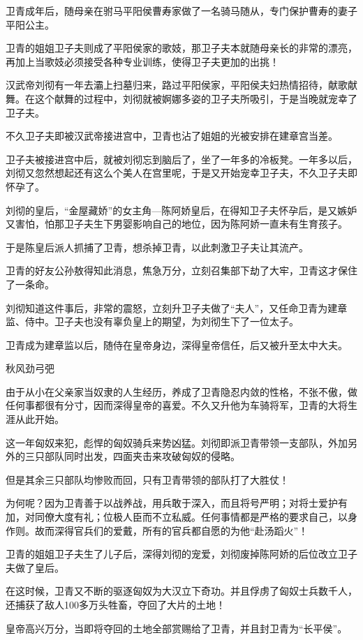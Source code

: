 \documentclass[UTF8,cap,nofonts,openany,twoside]{ctexbook}
\begin{document}
卫青成年后，随母亲在驸马平阳侯曹寿家做了一名骑马随从，专门保护曹寿的妻子平阳公主。

卫青的姐姐卫子夫则成了平阳侯家的歌妓，那卫子夫本就随母亲长的非常的漂亮，再加上当歌妓必须接受各种专业训练，使得卫子夫更加的出挑！

汉武帝刘彻有一年去灞上扫墓归来，路过平阳侯家，平阳侯夫妇热情招待，献歌献舞。在这个献舞的过程中，刘彻就被婀娜多姿的卫子夫所吸引，于是当晚就宠幸了卫子夫。

不久卫子夫即被汉武帝接进宫中，卫青也沾了姐姐的光被安排在建章宫当差。

卫子夫被接进宫中后，就被刘彻忘到脑后了，坐了一年多的冷板凳。一年多以后，刘彻又忽然想起还有这么个美人在宫里呢，于是又开始宠幸卫子夫，不久卫子夫即怀孕了。

刘彻的皇后，“金屋藏娇”的女主角---陈阿娇皇后，在得知卫子夫怀孕后，是又嫉妒又害怕，怕那卫子夫生下男婴影响自己的地位，因为陈阿娇一直未有生育孩子。

于是陈皇后派人抓捕了卫青，想杀掉卫青，以此刺激卫子夫让其流产。

卫青的好友公孙敖得知此消息，焦急万分，立刻召集部下劫了大牢，卫青这才保住了一条命。

刘彻知道这件事后，非常的震怒，立刻升卫子夫做了“夫人”，又任命卫青为建章监、侍中。卫子夫也没有辜负皇上的期望，为刘彻生下了一位太子。

卫青成为建章监以后，随侍在皇帝身边，深得皇帝信任，后又被升至太中大夫。

秋风劲弓弝

由于从小在父亲家当奴隶的人生经历，养成了卫青隐忍内敛的性格，不张不傲，做任何事都很有分寸，因而深得皇帝的喜爱。不久又升他为车骑将军，卫青的大将生涯从此开始。

这一年匈奴来犯，彪悍的匈奴骑兵来势凶猛。刘彻即派卫青带领一支部队，外加另外的三只部队同时出发，四面夹击来攻破匈奴的侵略。

但是其余三只部队均惨败而回，只有卫青带领的部队打了大胜仗！

为何呢？因为卫青善于以战养战，用兵敢于深入，而且将号严明；对将士爱护有加，对同僚大度有礼；位极人臣而不立私威。任何事情都是严格的要求自己，以身作则。故而深得官兵们的爱戴，所有的官兵都自愿的为他“赴汤蹈火”！

卫青的姐姐卫子夫生了儿子后，深得刘彻的宠爱，刘彻废掉陈阿娇的后位改立卫子夫做了皇后。

在这时候，卫青又不断的驱逐匈奴为大汉立下奇功。并且俘虏了匈奴士兵数千人，还捕获了敌人100多万头牲畜，夺回了大片的土地！

皇帝高兴万分，当即将夺回的土地全部赏赐给了卫青，并且封卫青为“长平侯”。
\end{document}
